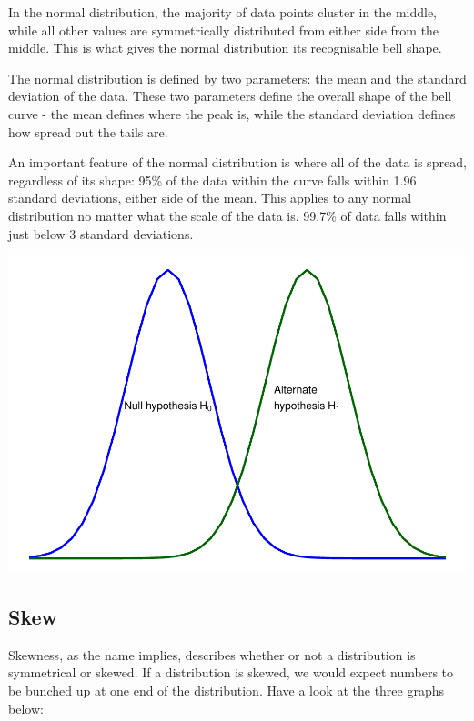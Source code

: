 \documentclass[
]{book}
\begin{document}
In the normal distribution, the majority of data points cluster in the middle, while all other values are symmetrically distributed from either side from the middle. This is what gives the normal distribution its recognisable bell shape.

The normal distribution is defined by two parameters: the mean and the standard deviation of the data. These two parameters define the overall shape of the bell curve - the mean defines where the peak is, while the standard deviation defines how spread out the tails are.

An important feature of the normal distribution is where all of the data is spread, regardless of its shape: 95\% of the data within the curve falls within 1.96 standard deviations, either side of the mean. This applies to any normal distribution no matter what the scale of the data is. 99.7\% of data falls within just below 3 standard deviations.

\begin{center}\includegraphics{_main_files/figure-latex/unnamed-chunk-81-1} \end{center}

\subsection{Skew}\label{skew}

Skewness, as the name implies, describes whether or not a distribution is symmetrical or skewed. If a distribution is skewed, we would expect numbers to be bunched up at one end of the distribution. Have a look at the three graphs below:
\end{document}
